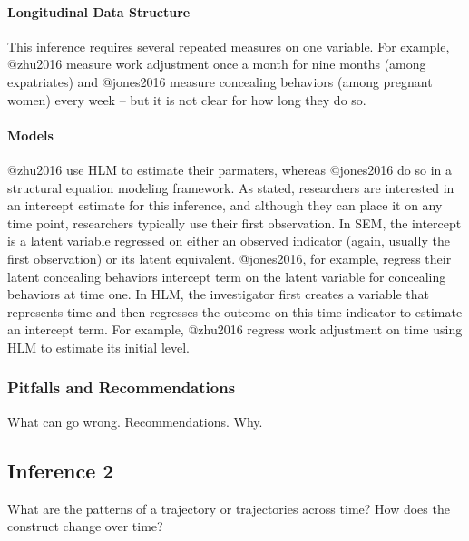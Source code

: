 \documentclass[]{article}
\let\oldparagraph\paragraph
\renewcommand{\paragraph}[1]{\oldparagraph{#1}\mbox{}}
\begin{document}
\hypertarget{longitudinal-data-structure-1}{%
\paragraph{Longitudinal Data
Structure}\label{longitudinal-data-structure-1}}

This inference requires several repeated measures on one variable. For
example, @zhu2016 measure work adjustment once a month for nine months
(among expatriates) and @jones2016 measure concealing behaviors (among
pregnant women) every week -- but it is not clear for how long they do
so.

\hypertarget{models-1}{%
\paragraph{Models}\label{models-1}}

@zhu2016 use HLM to estimate their parmaters, whereas @jones2016 do so
in a structural equation modeling framework. As stated, researchers are
interested in an intercept estimate for this inference, and although
they can place it on any time point, researchers typically use their
first observation. In SEM, the intercept is a latent variable regressed
on either an observed indicator (again, usually the first observation)
or its latent equivalent. @jones2016, for example, regress their latent
concealing behaviors intercept term on the latent variable for
concealing behaviors at time one. In HLM, the investigator first creates
a variable that represents time and then regresses the outcome on this
time indicator to estimate an intercept term. For example, @zhu2016
regress work adjustment on time using HLM to estimate its initial level.

\hypertarget{pitfalls-and-recommendations-1}{%
\subsubsection{Pitfalls and
Recommendations}\label{pitfalls-and-recommendations-1}}

What can go wrong. Recommendations. Why.

\hypertarget{inference-2}{%
\subsection{Inference 2}\label{inference-2}}

What are the patterns of a trajectory or trajectories across time? How
does the construct change over time?
\end{document}
